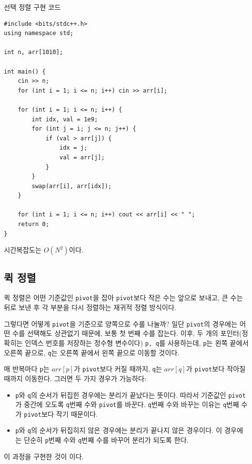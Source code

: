 \begin{code} \label{code: selection}
선택 정렬 구현 코드
\begin{lstlisting}
#include <bits/stdc++.h>
using namespace std;

int n, arr[1010];

int main() {
    cin >> n;
    for (int i = 1; i <= n; i++) cin >> arr[i];

    for (int i = 1; i <= n; i++) {
        int idx, val = 1e9;
        for (int j = i; j <= n; j++) {
            if (val > arr[j]) {
                idx = j;
                val = arr[j];
            }
        }
        swap(arr[i], arr[idx]);
    }

    for (int i = 1; i <= n; i++) cout << arr[i] << " ";
    return 0;
}

\end{lstlisting}
\end{code}

시간복잡도는 $O(N^2)$이다.

\subsection{퀵 정렬}
퀵 정렬은 어떤 기준값인 \texttt{pivot}을 잡아 \texttt{pivot}보다 작은 수는 앞으로 보내고, 큰 수는 뒤로 보낸 후 각 부분을 다시 정렬하는 재귀적 정렬 방식이다. 

그렇다면 어떻게 \texttt{pivot}을 기준으로 양쪽으로 수를 나눌까? 일단 \texttt{pivot}의 경우에는 어떤 수를 선택해도 상관없기 때문에, 보통 첫 번째 수를 잡는다. 이후, 두 개의 포인터(정확히는 인덱스 번호를 저장하는 정수형 변수이다) \texttt{p, q}를 사용하는데, \texttt{p}는 왼쪽 끝에서 오른쪽 끝으로, \texttt{q}는 오른쪽 끝에서 왼쪽 끝으로 이동할 것이다. 

매 반복마다 \texttt{p}는 $arr[p]$가 \texttt{pivot}보다 커질 때까지, \texttt{q}는 $arr[q]$가 \texttt{pivot}보다 작아질 때까지 이동한다. 그러면 두 가지 경우가 가능하다:
\begin{itemize}
    \item \texttt{p}와 \texttt{q}의 순서가 뒤집힌 경우에는 분리가 끝났다는 뜻이다. 따라서  기준값인 \texttt{pivot}가 중간에 오도록 \texttt{q}번째 수와 \texttt{pivot}를 바꾼다. \texttt{q}번째 수와 바꾸는 이유는 \texttt{q}번째 수가 \texttt{pivot}보다 작기 때문이다.
    \item \texttt{p}와 \texttt{q}의 순서가 뒤집히지 않은 경우에는 분리가 끝나지 않은 경우이다. 이 경우에는 단순히 \texttt{p}번째 수와 \texttt{q}번째 수를 바꾸어 분리가 되도록 한다.
\end{itemize}
이 과정을 구현한 것이 이다.

